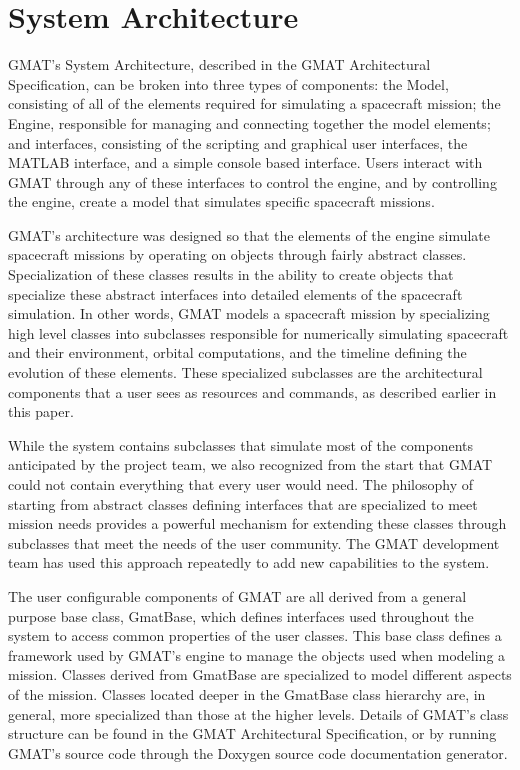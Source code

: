 \section{System Architecture}

GMAT's System Architecture, described in the GMAT Architectural
Specification\cite{ArchSpec}, can be broken into three types of components: the
Model, consisting of all of the elements required for simulating a spacecraft
mission; the Engine, responsible for managing and connecting together the model
elements; and interfaces, consisting of the scripting and graphical user
interfaces, the MATLAB interface, and a simple console based interface.  Users
interact with GMAT through any of these interfaces to control the engine, and by
controlling the engine, create a model that simulates specific spacecraft
missions.

GMAT's architecture was designed so that the elements of the engine simulate
spacecraft missions by operating on objects through fairly abstract classes.
Specialization of these classes results in the ability to create objects that
specialize these abstract interfaces into detailed elements of the spacecraft
simulation.  In other words, GMAT models a spacecraft mission by specializing
high level classes into subclasses responsible for numerically simulating
spacecraft and their environment, orbital computations, and the timeline
defining the evolution of these elements.  These specialized subclasses are the
architectural components that a user sees as resources and commands, as
described earlier in this paper.

While the system contains subclasses that simulate most of the components
anticipated by the project team, we also recognized from the start that GMAT
could not contain everything that every user would need.  The philosophy of
starting from abstract classes defining interfaces that are specialized to meet
mission needs provides a powerful mechanism for extending these classes through
subclasses that meet the needs of the user community.  The GMAT development
team has used this approach repeatedly to add new capabilities to the system.

The user configurable components of GMAT are all derived from a general purpose
base class, GmatBase, which defines interfaces used throughout the system to
access common properties of the user classes.  This base class defines a
framework used by GMAT's engine to manage the objects used when modeling a
mission.  Classes derived from GmatBase are specialized to model different
aspects of the mission.  Classes located deeper in the GmatBase class hierarchy
are, in general, more specialized than those at the higher levels.  Details of
GMAT's class structure can be found in the GMAT Architectural
Specification\cite{ArchSpec}, or by running GMAT's source code through the
Doxygen source code documentation generator\cite{Doxygen}.

